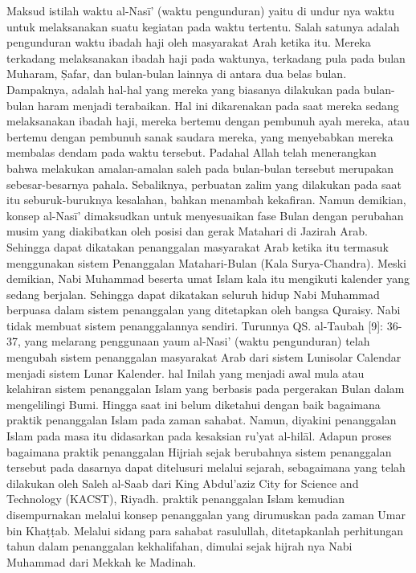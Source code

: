     Maksud istilah waktu al-Nasī' (waktu pengunduran) yaitu di undur nya waktu untuk melaksanakan suatu kegiatan pada waktu tertentu. Salah satunya adalah pengunduran waktu ibadah haji oleh masyarakat Arah ketika itu. Mereka terkadang melaksanakan ibadah haji pada waktunya, terkadang pula pada bulan Muharam, Ṣafar, dan bulan-bulan lainnya di antara dua belas bulan.
    Dampaknya, adalah hal-hal yang mereka yang biasanya dilakukan pada bulan-bulan haram menjadi terabaikan. Hal ini dikarenakan pada saat mereka sedang melaksanakan ibadah haji, mereka bertemu dengan pembunuh ayah mereka, atau bertemu dengan pembunuh sanak saudara mereka, yang menyebabkan mereka membalas dendam pada waktu tersebut.
    Padahal Allah telah menerangkan bahwa melakukan amalan-amalan saleh pada bulan-bulan tersebut merupakan sebesar-besarnya pahala. Sebaliknya, perbuatan zalim yang dilakukan pada saat itu seburuk-buruknya kesalahan, bahkan menambah kekafiran.
    Namun demikian, konsep al-Nasī’ dimaksudkan untuk menyesuaikan fase Bulan dengan perubahan musim yang diakibatkan oleh posisi dan gerak Matahari di Jazirah Arab. Sehingga dapat dikatakan penanggalan masyarakat Arab ketika itu termasuk menggunakan sistem Penanggalan Matahari-Bulan (Kala Surya-Chandra).
    Meski demikian, Nabi Muhammad beserta umat Islam kala itu mengikuti kalender yang sedang berjalan. Sehingga dapat dikatakan seluruh hidup Nabi Muhammad berpuasa dalam sistem penanggalan yang ditetapkan oleh bangsa Quraisy. Nabi tidak membuat sistem penanggalannya sendiri. Turunnya QS.
    al-Taubah [9]: 36-37, yang melarang penggunaan yaum al-Nasi’ (waktu pengunduran) telah mengubah sistem penanggalan masyarakat Arab dari sistem Lunisolar Calendar menjadi sistem Lunar Kalender. hal Inilah yang menjadi awal mula atau kelahiran sistem penanggalan Islam yang berbasis pada pergerakan Bulan dalam mengelilingi Bumi.
    Hingga saat ini belum diketahui dengan baik bagaimana praktik penanggalan Islam pada zaman sahabat. Namun, diyakini penanggalan Islam pada masa itu didasarkan pada kesaksian ru’yat al-hilāl. Adapun proses bagaimana praktik penanggalan Hijriah sejak berubahnya sistem penanggalan tersebut pada dasarnya dapat ditelusuri melalui sejarah, sebagaimana yang telah dilakukan oleh Saleh al-Saab dari King Abdul’aziz City for Science and Technology (KACST), Riyadh.
    praktik penanggalan Islam kemudian disempurnakan melalui konsep penanggalan yang dirumuskan pada zaman Umar bin Khaṭṭab. Melalui sidang para sahabat rasulullah, ditetapkanlah perhitungan tahun dalam penanggalan kekhalifahan, dimulai sejak hijrah nya Nabi Muhammad dari Mekkah ke Madinah.
